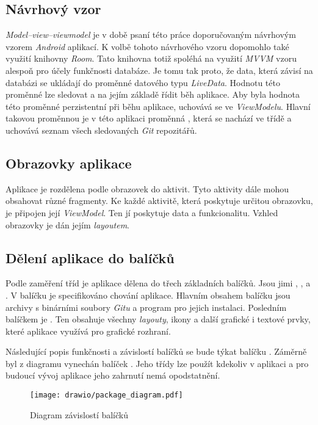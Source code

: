     \subsection{Návrhový vzor}
    \emph{Model–view–viewmodel} je v době psaní této práce doporučovaným návrhovým vzorem \emph{Android} aplikací. K volbě tohoto návrhového vzoru dopomohlo také využití knihovny \emph{Room}. Tato knihovna totiž spoléhá na využití \emph{MVVM} vzoru alespoň pro účely funkčnosti databáze. Je tomu tak proto, že data, která závisí na databázi se ukládají do proměnné datového typu \emph{LiveData}. Hodnotu této proměnné lze sledovat a na jejím základě řídit běh aplikace. Aby byla hodnota této proměnné perzistentní při běhu aplikace, uchovává se ve \emph{ViewModelu}. Hlavní takovou proměnnou je v této aplikaci proměnná , která se nachází ve třídě  a uchovává seznam všech sledovaných \emph{Git} repozitářů.
    
    \subsection{Obrazovky aplikace}
    Aplikace je rozdělena podle obrazovek do aktivit. Tyto aktivity dále mohou obsahovat různé fragmenty. Ke každé aktivitě, která poskytuje určitou obrazovku, je připojen její \emph{ViewModel}. Ten jí poskytuje data a funkcionalitu. Vzhled obrazovky je dán jejím \emph{layoutem}.

    \newpage
    \subsection{Dělení aplikace do balíčků}
    Podle zaměření tříd je aplikace dělena do třech základních balíčků. Jsou jimi , , a . V balíčku  je specifikováno chování aplikace. Hlavním obsahem balíčku  jsou archivy s binárními soubory \emph{Gitu} a program  pro jejich instalaci. Posledním balíčkem je . Ten obsahuje všechny \emph{layouty}, ikony a další grafické i textové prvky, které aplikace využívá pro grafické rozhraní.

    Následující popis funkčnosti a závislostí balíčků se bude týkat balíčku . Záměrně byl z diagramu vynechán balíček . Jeho třídy lze použít kdekoliv v aplikaci a pro budoucí vývoj aplikace jeho zahrnutí nemá opodstatnění.

    \begin{figure}[h]
        \centering
        \vspace{0.5cm}
        \texttt{[image: drawio/package\_diagram.pdf]}
        \caption[Diagram závislostí balíčků]{Diagram závislostí balíčků}
        \label{diagram:packages}
    \end{figure}

